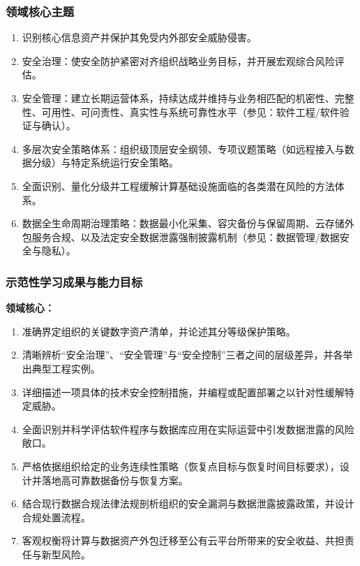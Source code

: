 \subsubsection{领域核心主题}
\begin{enumerate}\setlength{\itemsep}{0pt}\setlength{\parskip}{0pt}
    \item 识别核心信息资产并保护其免受内外部安全威胁侵害。
    \item 安全治理：使安全防护紧密对齐组织战略业务目标，并开展宏观综合风险评估。
    \item 安全管理：建立长期运营体系，持续达成并维持与业务相匹配的机密性、完整性、可用性、可问责性、真实性与系统可靠性水平（参见：软件工程/软件验证与确认）。
    \item 多层次安全策略体系：组织级顶层安全纲领、专项议题策略（如远程接入与数据分级）与特定系统运行安全策略。
    \item 全面识别、量化分级并工程缓解计算基础设施面临的各类潜在风险的方法体系。
    \item 数据全生命周期治理策略：数据最小化采集、容灾备份与保留周期、云存储外包服务合规、以及法定安全数据泄露强制披露机制（参见：数据管理/数据安全与隐私）。
\end{enumerate}

\subsubsection{示范性学习成果与能力目标}
\textbf{领域核心：}
\begin{enumerate}\setlength{\itemsep}{0pt}\setlength{\parskip}{0pt}
    \item 准确界定组织的关键数字资产清单，并论述其分等级保护策略。
    \item 清晰辨析“安全治理”、“安全管理”与“安全控制”三者之间的层级差异，并各举出典型工程实例。
    \item 详细描述一项具体的技术安全控制措施，并编程或配置部署之以针对性缓解特定威胁。
    \item 全面识别并科学评估软件程序与数据库应用在实际运营中引发数据泄露的风险敞口。
    \item 严格依据组织给定的业务连续性策略（恢复点目标与恢复时间目标要求），设计并落地高可靠数据备份与恢复方案。
    \item 结合现行数据合规法律法规剖析组织的安全漏洞与数据泄露披露政策，并设计合规处置流程。
    \item 客观权衡将计算与数据资产外包迁移至公有云平台所带来的安全收益、共担责任与新型风险。
\end{enumerate}

